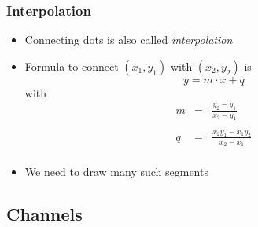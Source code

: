 \begin{frame}
  \frametitle{Interpolation}
  \begin{itemize}
    \item Connecting dots is also called \emph{interpolation}
    \item Formula to connect $(x_1,y_1)$ with $(x_2,y_2)$ is
          \[
            y = m \cdot x + q
          \]
          with
          \[
            \begin{array}{rcl}
              m & = & \displaystyle \frac{y_2-y_1}{x_2-y_1} \\ \\
              q & = & \displaystyle \frac{x_2 y_1-x_1y_2}{x_2-x_1} \\
            \end{array}
          \]
    \item We need to draw many such segments
  \end{itemize}
\end{frame}

\subsection{Channels}

\frame{\tableofcontents[currentsubsection]}

